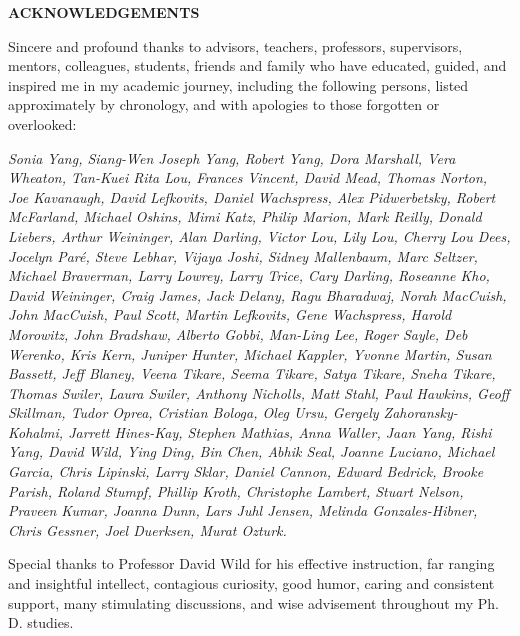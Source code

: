 \begin{centering}
\textbf{ACKNOWLEDGEMENTS}\\
\vspace{\baselineskip}
\end{centering}

Sincere and profound thanks to advisors, teachers, professors, supervisors, mentors, colleagues, students, friends and family who have educated, guided, and inspired me in my academic journey, including the following persons, listed approximately by chronology, and with apologies to those forgotten or overlooked:

\begin{singlespace}
\textit{Sonia Yang, Siang-Wen Joseph Yang, Robert Yang, Dora Marshall, Vera Wheaton, Tan-Kuei Rita Lou, Frances Vincent, David Mead, Thomas Norton, Joe Kavanaugh, David Lefkovits, Daniel Wachspress, Alex Pidwerbetsky, Robert McFarland, Michael Oshins, Mimi Katz, Philip Marion, Mark Reilly, Donald Liebers, Arthur Weininger, Alan Darling, Victor Lou, Lily Lou, Cherry Lou Dees, Jocelyn Par\'e, Steve Lebhar, Vijaya Joshi, Sidney Mallenbaum, Marc Seltzer, Michael Braverman, Larry Lowrey, Larry Trice, Cary Darling, Roseanne Kho, David Weininger, Craig James, Jack Delany, Ragu Bharadwaj, Norah MacCuish, John MacCuish, Paul Scott, Martin Lefkovits, Gene Wachspress, Harold Morowitz, John Bradshaw, Alberto Gobbi, Man-Ling Lee, Roger Sayle, Deb Werenko, Kris Kern, Juniper Hunter, Michael Kappler, Yvonne Martin, Susan Bassett, Jeff Blaney, Veena Tikare, Seema Tikare, Satya Tikare, Sneha Tikare, Thomas Swiler, Laura Swiler, Anthony Nicholls, Matt Stahl, Paul Hawkins, Geoff Skillman, Tudor Oprea, Cristian Bologa, Oleg Ursu, Gergely Zahoransky-Kohalmi, Jarrett Hines-Kay, Stephen Mathias, Anna Waller, Jaan Yang, Rishi Yang, David Wild, Ying Ding, Bin Chen, Abhik Seal, Joanne Luciano, Michael Garcia, Chris Lipinski, Larry Sklar, Daniel Cannon, Edward Bedrick, Brooke Parish, Roland Stumpf, Phillip Kroth, Christophe Lambert, Stuart Nelson, Praveen Kumar, Joanna Dunn, Lars Juhl Jensen, Melinda Gonzales-Hibner, Chris Gessner, Joel Duerksen, Murat Ozturk.}
\end{singlespace}

Special thanks to Professor David Wild for his effective instruction, far ranging and insightful intellect, contagious curiosity, good humor, caring and consistent support, many stimulating discussions, and wise advisement throughout my Ph. D. studies.